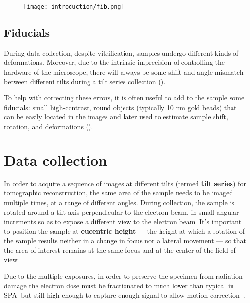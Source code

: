 \begin{figure}[!ht]
    \centering
    \texttt{[image: introduction/fib.png]}
    \label{fig:et_fib_milling}
\end{figure}

\subsection{Fiducials}\label{fiducials}
During data collection, despite vitrification, samples undergo different kinds of deformations.
Moreover, due to the intrinsic imprecision of controlling the hardware of the microscope, there will always be some shift and angle mismatch between different tilts during a tilt series collection ().

To help with correcting these errors, it is often useful to add to the sample some fiducials: small high-contrast, round objects (typically 10 nm gold beads) that can be easily located in the images and later used to estimate sample shift, rotation, and deformations ().

\section{Data collection}\label{et_data_collection}
In order to acquire a sequence of images at different tilts (termed \textbf{tilt series}) for tomographic reconstruction, the same area of the sample needs to be imaged multiple times, at a range of different angles.
During collection, the sample is rotated around a tilt axis perpendicular to the electron beam, in small angular increments so as to expose a different view to the electron beam.
It's important to position the sample at \textbf{eucentric height} --- the height at which a rotation of the sample results neither in a change in focus nor a lateral movement --- so that the area of interest remains at the same focus and at the center of the field of view.

Due to the multiple exposures, in order to preserve the specimen from radiation damage the electron dose must be fractionated to much lower than typical in SPA, but still high enough to capture enough signal to allow motion correction~\cite{mcewenRelevanceDosefractionationTomography1995}.

